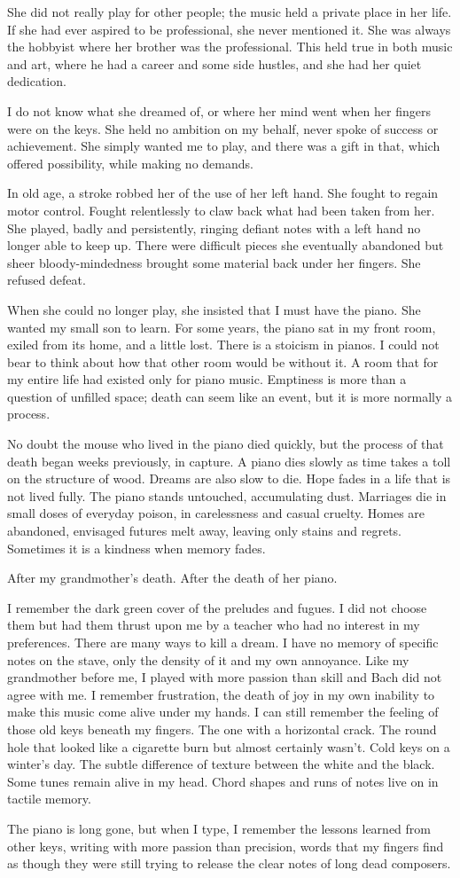 She did not really play for other people; the music held a private
place in her life. If she had ever aspired to be professional, she
never mentioned it. She was always the hobbyist where her brother was
the professional. This held true in both music and art, where he had a
career and some side hustles, and she had her quiet dedication.

I do not know what she dreamed of, or where her mind went when her
fingers were on the keys. She held no ambition on my behalf, never
spoke of success or achievement. She simply wanted me to play, and
there was a gift in that, which offered possibility, while making no
demands.

In old age, a stroke robbed her of the use of her left hand. She
fought to regain motor control. Fought relentlessly to claw back what
had been taken from her. She played, badly and persistently, ringing
defiant notes with a left hand no longer able to keep up. There were
difficult pieces she eventually abandoned but sheer bloody-mindedness
brought some material back under her fingers. She refused defeat.

When she could no longer play, she insisted that I must have the
piano. She wanted my small son to learn. For some years, the piano sat
in my front room, exiled from its home, and a little lost. There is a
stoicism in pianos. I could not bear to think about how that other
room would be without it. A room that for my entire life had existed
only for piano music. Emptiness is more than a question of unfilled
space; death can seem like an event, but it is more normally a
process.

No doubt the mouse who lived in the piano died quickly, but the
process of that death began weeks previously, in capture. A piano dies
slowly as time takes a toll on the structure of wood. Dreams are also
slow to die. Hope fades in a life that is not lived fully. The piano
stands untouched, accumulating dust. Marriages die in small doses of
everyday poison, in carelessness and casual cruelty. Homes are
abandoned, envisaged futures melt away, leaving only stains and
regrets. Sometimes it is a kindness when memory fades.

After my grandmother's death. After the death of her piano.

I remember the dark green cover of the preludes and fugues. I did not
choose them but had them thrust upon me by a teacher who had no
interest in my preferences. There are many ways to kill a dream. I
have no memory of specific notes on the stave, only the density of it
and my own annoyance. Like my grandmother before me, I played with
more passion than skill and Bach did not agree with me. I remember
frustration, the death of joy in my own inability to make this music
come alive under my hands. I can still remember the feeling of those
old keys beneath my fingers. The one with a horizontal crack. The
round hole that looked like a cigarette burn but almost certainly
wasn't. Cold keys on a winter's day. The subtle difference of texture
between the white and the black. Some tunes remain alive in my
head. Chord shapes and runs of notes live on in tactile memory.

The piano is long gone, but when I type, I remember the lessons
learned from other keys, writing with more passion than precision,
words that my fingers find as though they were still trying to release
the clear notes of long dead composers.
